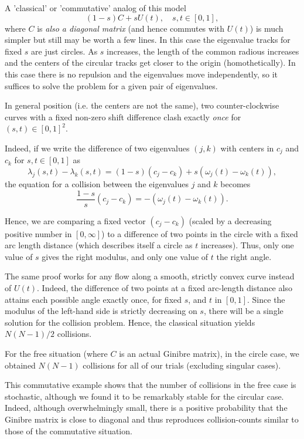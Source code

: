 \documentclass{article}
\begin{document}
	A 'classical' or 'commutative' analog of this model
	$$(1-s)C + sU(t), \quad s,t \in [0,1],$$
	where $C$ is \emph{also a diagonal matrix} (and hence commutes with $U(t)$) is much simpler 
	but still may be worth a few lines. 
	In this case the eigenvalue tracks for fixed $s$ are just circles.
	As $s$ increases, the length of the common radious increases and the centers 
	of the circular tracks get closer to the origin (homothetically).
	In this case there is no repulsion and the eigenvalues move independently, 
	so it suffices to solve the problem for a given pair of eigenvalues.
	
	In general position (i.e. the centers are not the same), 
	two counter-clockwise curves with a fixed non-zero shift difference 
	clash exactly \emph{once} for $(s,t) \in[0,1]^2$.	
	
	Indeed, if we write the difference of two eigenvalues $(j,k)$ with centers in $c_j$ and $c_k$ for $s,t \in [0,1]$ as
	$$
	\lambda_j(s, t) - \lambda_k(s, t) = (1 - s)(c_j - c_k) + s\left( \omega_j(t) - \omega_k(t) \right),
	$$
	the equation for a collision between the eigenvalues \( j \) and \( k \) becomes
	$$
	\frac{1 - s}{s}(c_j - c_k) = -\left( \omega_j(t) - \omega_k(t) \right).
	$$

	Hence, we are comparing a fixed vector $(c_j - c_k)$ 
	(scaled by a decreasing positive number in $[0,\infty]$) 
	to a difference of two points in the circle with a fixed arc length distance
	(which describes itself a circle as $t$ increases).
	Thus, only one value of $s$ gives the right modulus, 
	and only one value of $t$ the right angle.
	
	The same proof works for any flow along a smooth, strictly convex curve instead of $U(t)$. 
	Indeed, the difference of two points at a fixed arc-length 
	distance also attains each possible angle exactly once, for fixed $s$, and $t$ in $[0,1]$.
	Since the modulus of the left-hand side is strictly decreasing on $s$, 
	there will be a single solution for the collision problem.
	Hence, the classical situation yields $N(N-1)/2$ collisions.

	For the free situation (where $C$ is an actual Ginibre matrix), in the circle case,
	we obtained $N(N-1)$ collisions for all of our trials (excluding singular cases).

	This commutative example shows that the number of collisions in the free case is stochastic,
	although we found it to be remarkably stable for the circular case.
	Indeed, although overwhelmingly small, there is a positive probability 
	that the Ginibre matrix is close to diagonal and thus reproduces collision-counts 
	similar to those of the commutative situation.
	
\end{document}
